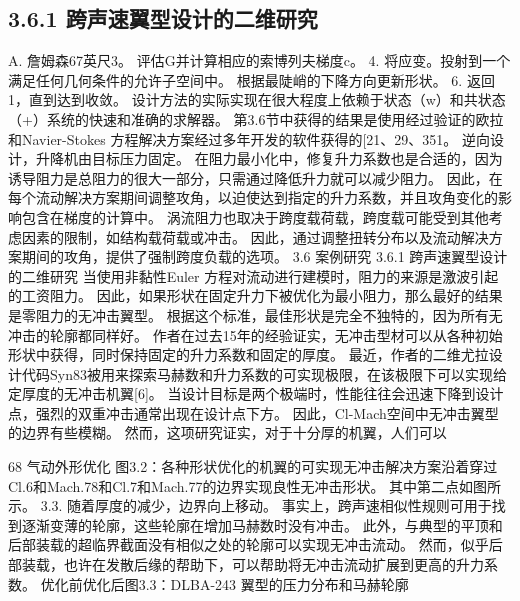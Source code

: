 \documentclass[UTF8,11pt,a4paper,openany,fontset=fandol]{ctexbook}
\begin{document}
\subsection{3.6.1 跨声速翼型设计的二维研究}
A. 詹姆森67英尺3。 评估G并计算相应的索博列夫梯度c。 4. 将应变。投射到一个满足任何几何条件的允许子空间中。 根据最陡峭的下降方向更新形状。 6. 返回1，直到达到收敛。 设计方法的实际实现在很大程度上依赖于状态（w）和共状态（+）系统的快速和准确的求解器。 第3.6节中获得的结果是使用经过验证的欧拉和Navier-Stokes 方程解决方案经过多年开发的软件获得的[21、29、351。 逆向设计，升降机由目标压力固定。 在阻力最小化中，修复升力系数也是合适的，因为诱导阻力是总阻力的很大一部分，只需通过降低升力就可以减少阻力。 因此，在每个流动解决方案期间调整攻角，以迫使达到指定的升力系数，并且攻角变化的影响包含在梯度的计算中。 涡流阻力也取决于跨度载荷载，跨度载可能受到其他考虑因素的限制，如结构载荷载或冲击。 因此，通过调整扭转分布以及流动解决方案期间的攻角，提供了强制跨度负载的选项。 3.6 案例研究 3.6.1 跨声速翼型设计的二维研究 当使用非黏性Euler 方程对流动进行建模时，阻力的来源是激波引起的工资阻力。 因此，如果形状在固定升力下被优化为最小阻力，那么最好的结果是零阻力的无冲击翼型。 根据这个标准，最佳形状是完全不独特的，因为所有无冲击的轮廓都同样好。 作者在过去15年的经验证实，无冲击型材可以从各种初始形状中获得，同时保持固定的升力系数和固定的厚度。 最近，作者的二维尤拉设计代码Syn83被用来探索马赫数和升力系数的可实现极限，在该极限下可以实现给定厚度的无冲击机翼[6]。 当设计目标是两个极端时，性能往往会迅速下降到设计点，强烈的双重冲击通常出现在设计点下方。 因此，Cl-Mach空间中无冲击翼型的边界有些模糊。 然而，这项研究证实，对于十分厚的机翼，人们可以

68 气动外形优化 图3.2：各种形状优化的机翼的可实现无冲击解决方案沿着穿过Cl.6和Mach.78和Cl.7和Mach.77的边界实现良性无冲击形状。 其中第二点如图所示。 3.3. 随着厚度的减少，边界向上移动。 事实上，跨声速相似性规则可用于找到逐渐变薄的轮廓，这些轮廓在增加马赫数时没有冲击。 此外，与典型的平顶和后部装载的超临界截面没有相似之处的轮廓可以实现无冲击流动。 然而，似乎后部装载，也许在发散后缘的帮助下，可以帮助将无冲击流动扩展到更高的升力系数。 优化前优化后图3.3：DLBA-243 翼型的压力分布和马赫轮廓
\end{document}
